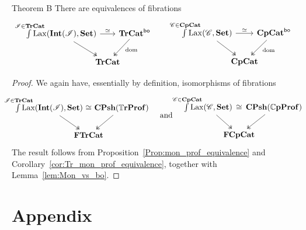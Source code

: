 \documentclass[11pt,oneside,article]{memoir}
\begin{document}
\begin{named}{Theorem B}
      \label{thm:TheoremB}
   There are equivalences of fibrations
   \begin{equation*}
      \begin{tikzcd}[column sep=-1em]
         \int\limits^{\mathclap{\cat{I}\in\TrCat}} \Lax(\Int(\cat{I}),\Set)
               \ar[rr,"\equiv"] \ar[dr,two heads]
            && \TrCat^{\bo} \ar[dl,two heads,"\dom" pos=.4] \\
         & \TrCat &
      \end{tikzcd}
      \qquad\quad
      \begin{tikzcd}[column sep=-1em]
         \int\limits^{\mathclap{\cat{C}\in\CompCat}} \Lax(\cat{C},\Set)
               \ar[rr,"\equiv"] \ar[dr,two heads]
            && \CompCat^{\bo} \ar[dl,two heads,"\dom" pos=.4] \\
         & \CompCat &
      \end{tikzcd}
   \end{equation*}
\end{named}
\begin{proof}
   We again have, essentially by definition, isomorphisms of fibrations
   \begin{equation*}
      \begin{tikzcd}[column sep=-2em]
         \int\limits^{\mathclap{\cat{I}\in\TrCat}}\Lax(\Int(\cat{I}),\Set)
               \ar[rr,phantom,"\iso"] \ar[dr,two heads]
            && \CPsh(\dTrProf) \ar[dl,two heads] \\
         & \FrTrCat &
      \end{tikzcd}
      \quad\text{and}\quad
      \begin{tikzcd}[column sep=-2em]
         \int\limits^{\mathclap{\cat{C}\in\CompCat}}\Lax(\cat{C},\Set)
               \ar[rr,phantom,"\iso"] \ar[dr,two heads]
            && \CPsh(\dCompProf) \ar[dl,two heads] \\
         & \FrCompCat &
      \end{tikzcd}
   \end{equation*}
   The result follows from Proposition~\ref{Prop:mon_prof_equivalence} and
   Corollary~\ref{cor:Tr_mon_prof_equivalence}, together with Lemma~\ref{lem:Mon_vs_bo}.
\end{proof}

\appendix
\chapter{Appendix}
      \label{appendix}
\end{document}
